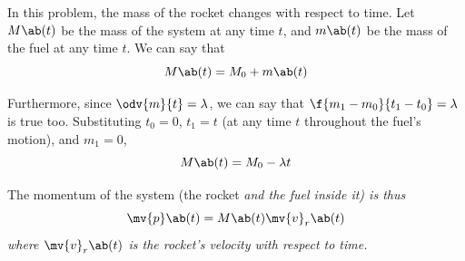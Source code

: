 In this problem, the mass of the rocket changes with respect to time.
Let \(M\ab(t)\) be the mass
of the system at any time \(t\), and \(m\ab(t)\) be the mass of the fuel at any
time \(t\).
We can say that
\begin{equation}
	M\ab(t) = M_0 + m\ab(t)
\end{equation}

Furthermore, since \(\odv{m}{t}=\lambda\), we can say that
\(\f{m_1 - m_0}{t_1-t_0}=\lambda\) is true too. Substituting \(t_0 = 0\),
\(t_1 = t\) (at any time \(t\) throughout the fuel's motion), and \(m_1 = 0\),
\begin{equation}
	M\ab(t) = M_0 - \lambda t
	\label{eq:systemmass}
\end{equation}

The momentum of the system (the rocket \it{and} the fuel inside it) is thus
\begin{equation}
	\mv{p}\ab(t) = M\ab(t)\mv{v}_r\ab(t)
	\label{eq:sysp}
\end{equation}
where \(\mv{v}_r\ab(t)\) is the rocket's velocity with respect to time.

